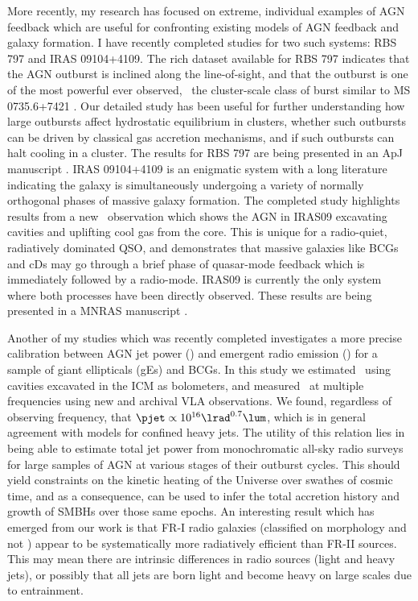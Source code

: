 \documentclass[11pt]{article}
\begin{document}
More recently, my research has focused on extreme, individual examples
of AGN feedback which are useful for confronting existing models of
AGN feedback and galaxy formation. I have recently completed studies
for two such systems: RBS 797 and IRAS 09104+4109. The rich dataset
available for RBS 797 indicates that the AGN outburst is inclined
along the line-of-sight, and that the outburst is one of the most
powerful ever observed, \eg\ the cluster-scale class of burst similar
to MS 0735.6+7421 \cite{ms0735}. Our detailed study has been useful
for further understanding how large outbursts affect hydrostatic
equilibrium in clusters, whether such outbursts can be driven by
classical gas accretion mechanisms, and if such outbursts can halt
cooling in a cluster. The results for RBS 797 are being presented in
an ApJ manuscript \cite{r797}. IRAS 09104+4109 is an enigmatic system
with a long literature indicating the galaxy is simultaneously
undergoing a variety of normally orthogonal phases of massive galaxy
formation. The completed study highlights results from a new \chandra\
observation which shows the AGN in IRAS09 excavating cavities and
uplifting cool gas from the core. This is unique for a radio-quiet,
radiatively dominated QSO, and demonstrates that massive galaxies like
BCGs and cDs may go through a brief phase of quasar-mode feedback
which is immediately followed by a radio-mode. IRAS09 is currently the
only system where both processes have been directly observed. These
results are being presented in a MNRAS manuscript \cite{iras09}.

Another of my studies which was recently completed \cite{pjet}
investigates a more precise calibration between AGN jet power (\pjet)
and emergent radio emission (\lrad) for a sample of giant ellipticals
(gEs) and BCGs. In this study we estimated \pjet\ using cavities
excavated in the ICM as bolometers, and measured \lrad\ at multiple
frequencies using new and archival VLA observations. We found,
regardless of observing frequency, that $\pjet \propto 10^{16}
\lrad^{0.7} \lum$, which is in general agreement with models for
confined heavy jets. The utility of this relation lies in being able
to estimate total jet power from monochromatic all-sky radio surveys
for large samples of AGN at various stages of their outburst
cycles. This should yield constraints on the kinetic heating of the
Universe over swathes of cosmic time, and as a consequence, can be
used to infer the total accretion history and growth of SMBHs over
those same epochs. An interesting result which has emerged from our
work is that FR-I radio galaxies (classified on morphology and not
\lrad) appear to be systematically more radiatively efficient than
FR-II sources. This may mean there are intrinsic differences in radio
sources (light and heavy jets), or possibly that all jets are born
light and become heavy on large scales due to entrainment.
\end{document}

